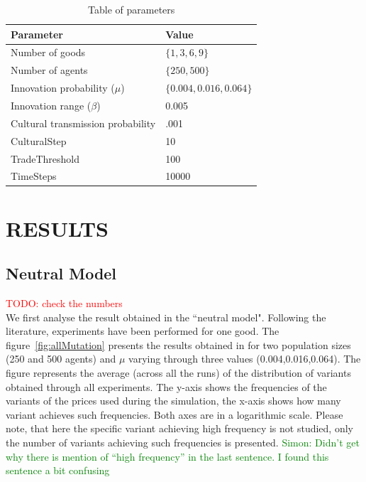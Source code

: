 \documentclass{wscpaperproc}
\newcommand{\memo}[2]{\textcolor{#1}{#2}}
\newcommand{\todo}[1]{\memo{red}{TODO: #1\\}}
\newcommand{\simon}[1]{\memo{green}{Simon: #1\\}}
\begin{document}

\begin{table}
\begin{center}
\begin{tabular}{@{}ll@{}}
\toprule
Parameter & Value \\
\midrule
Number of goods & $\{1,3,6,9\}$ \\
Number of agents & $\{250,500\}$ \\
Innovation probability ($\mu$) & $\{0.004,0.016,0.064\}$ \\
Innovation range ($\beta$) & 0.005\\
Cultural transmission probability & .001\\
CulturalStep &  10 \\
TradeThreshold & 100  \\
TimeSteps & 10000 \\
\bottomrule
\end{tabular}
\caption{Table of parameters}\label{tab:parameters}
\end{center}
\end{table}






\section{RESULTS}
\subsection{Neutral Model}

\todo{check the numbers}
We first analyse the result obtained in the ``neutral model". Following the literature, experiments have been performed for one good. The figure~\ref{fig:allMutation} presents the results obtained in for two population sizes (250 and 500 agents) and $\mu$ varying through three values (0.004,0.016,0.064). The figure represents the average (across all the runs) of the distribution of variants obtained through all experiments. The y-axis shows the frequencies of the variants of the prices used during the simulation, the x-axis shows how many variant achieves such frequencies. Both axes are in a logarithmic scale. Please note, that here the specific variant achieving high frequency is not studied, only the number of variants achieving such frequencies is presented.
\simon{Didn't get why there is mention of ``high frequency'' in the last sentence. I found this sentence a bit confusing }
\end{document}
